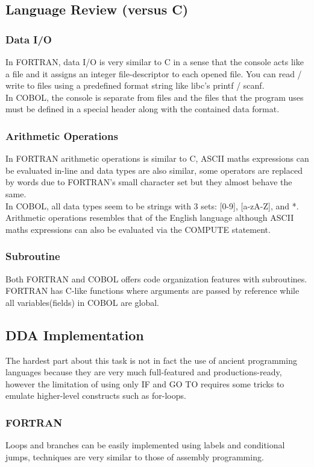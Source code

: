 \documentclass[11pt, a4paper, fleqn, oneside]{article}
\begin{document}
\subsection*{Language Review (versus C)}
\subsubsection*{Data I/O}
In FORTRAN, data I/O is very similar to C in a sense that the console acts like a file and
it assigns an integer file-descriptor to each opened file. You can read / write to files using
a predefined format string like libc's printf / scanf.\\
In COBOL, the console is separate from files and the files that the program uses must be defined
in a special header along with the contained data format.
\subsubsection*{Arithmetic Operations}
In FORTRAN arithmetic operations is similar to C, ASCII maths expressions can be evaluated
in-line and data types are also similar, some operators are replaced by words due to FORTRAN's
small character set but they almost behave the same.\\
In COBOL, all data types seem to be strings with 3 sets: [0-9], [a-zA-Z], and *.
Arithmetic operations resembles that of the English language although ASCII maths expressions
can also be evaluated via the COMPUTE statement.
\subsubsection*{Subroutine}
Both FORTRAN and COBOL offers code organization features with subroutines.
FORTRAN has C-like functions where arguments are passed by reference while
all variables(fields) in COBOL are global.

\subsection*{DDA Implementation}
The hardest part about this task is not in fact the use of ancient programming languages
because they are very much full-featured and productions-ready, however the limitation of using
only IF and GO TO requires some tricks to emulate higher-level constructs such as for-loops.
\subsubsection*{FORTRAN}
Loops and branches can be easily implemented using labels and conditional jumps, techniques are
very similar to those of assembly programming.
\end{document}
